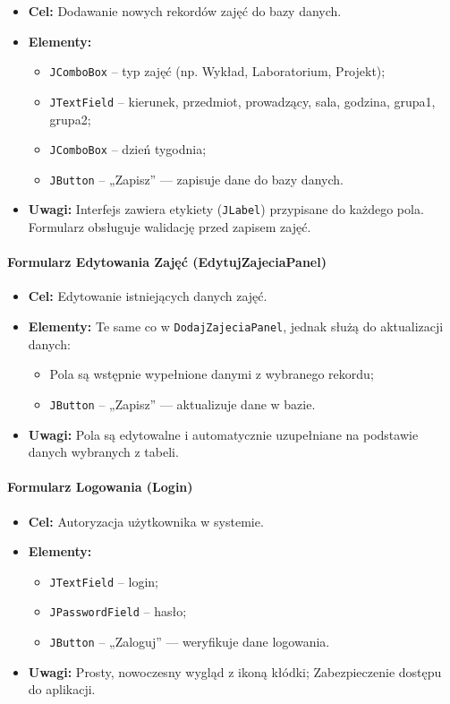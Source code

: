 \begin{itemize}
    \item \textbf{Cel:} Dodawanie nowych rekordów zajęć do bazy danych.
    \item \textbf{Elementy:}
    \begin{itemize}
        \item \texttt{JComboBox} – typ zajęć (np. Wykład, Laboratorium, Projekt);
        \item \texttt{JTextField} – kierunek, przedmiot, prowadzący, sala, godzina, grupa1, grupa2;
        \item \texttt{JComboBox} – dzień tygodnia;
        \item \texttt{JButton} – „Zapisz” — zapisuje dane do bazy danych.
    \end{itemize}
    \item \textbf{Uwagi:} Interfejs zawiera etykiety (\texttt{JLabel}) przypisane do każdego pola. Formularz obsługuje walidację przed zapisem zajęć.
\end{itemize}

\paragraph{Formularz Edytowania Zajęć (EdytujZajeciaPanel)}

\begin{itemize}
    \item \textbf{Cel:} Edytowanie istniejących danych zajęć.
    \item \textbf{Elementy:} Te same co w \texttt{DodajZajeciaPanel}, jednak służą do aktualizacji danych:
    \begin{itemize}
        \item Pola są wstępnie wypełnione danymi z wybranego rekordu;
        \item \texttt{JButton} – „Zapisz” — aktualizuje dane w bazie.
    \end{itemize}
    \item \textbf{Uwagi:} Pola są edytowalne i automatycznie uzupełniane na podstawie danych wybranych z tabeli.
\end{itemize}

\paragraph{Formularz Logowania (Login)}

\begin{itemize}
    \item \textbf{Cel:} Autoryzacja użytkownika w systemie.
    \item \textbf{Elementy:}
    \begin{itemize}
        \item \texttt{JTextField} – login;
        \item \texttt{JPasswordField} – hasło;
        \item \texttt{JButton} – „Zaloguj” — weryfikuje dane logowania.
    \end{itemize}
    \item \textbf{Uwagi:} Prosty, nowoczesny wygląd z ikoną kłódki; Zabezpieczenie dostępu do aplikacji.
\end{itemize}

